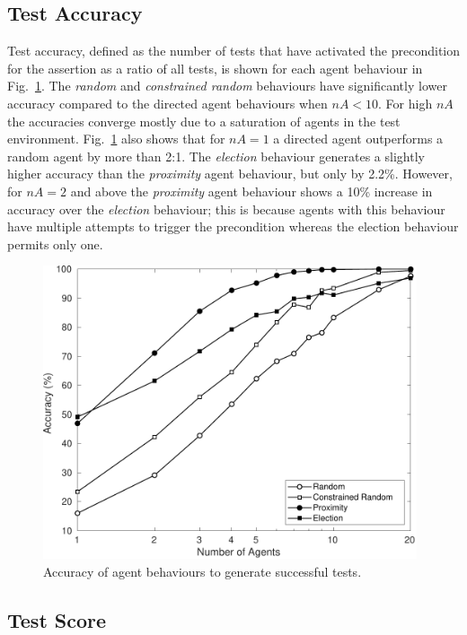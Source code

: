 \documentclass[runningheads,a4paper]{llncs}
\begin{document}
\subsection{Test Accuracy}
Test accuracy, defined as the number of tests that have activated the precondition for the assertion as a ratio of all tests, is shown for each agent behaviour in Fig.~\ref{f:accuracy}. The \textit{random} and \textit{constrained random} behaviours have significantly lower accuracy compared to the directed agent behaviours when $nA<10$. For high $nA$ the accuracies converge mostly due to a saturation of agents in the test environment. Fig.~\ref{f:accuracy} also shows that for $nA=1$ a directed agent outperforms a random agent by more than 2:1. The \textit{election} behaviour generates a slightly higher accuracy than the \textit{proximity} agent behaviour, but only by 2.2\%. However, for $nA=2$ and above the \textit{proximity} agent behaviour shows a 10\% increase in accuracy over the \textit{election} behaviour; this is because agents with this behaviour have multiple attempts to trigger the precondition whereas the election behaviour permits only one. 

\begin{figure}[!t]
	\centering
\includegraphics[width=0.98\textwidth]{Accuracy.pdf}
	\caption{Accuracy of agent behaviours to generate successful tests.}
	\label{f:accuracy}
\end{figure}

\subsection{Test Score} \label{s:testscore}
\end{document}
